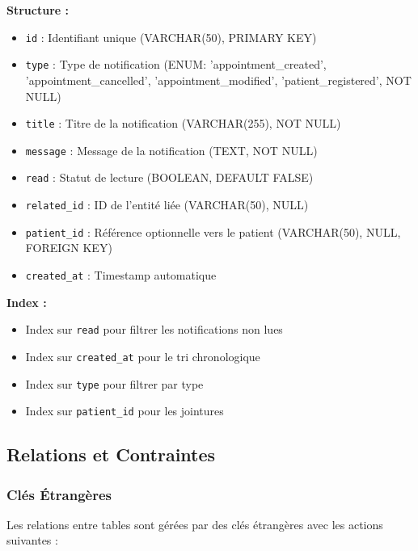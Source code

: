 \documentclass[12pt,a4paper]{report}
\begin{document}
\textbf{Structure :}
\begin{itemize}
    \item \texttt{id} : Identifiant unique (VARCHAR(50), PRIMARY KEY)
    \item \texttt{type} : Type de notification (ENUM: 'appointment\_created', 'appointment\_cancelled', 'appointment\_modified', 'patient\_registered', NOT NULL)
    \item \texttt{title} : Titre de la notification (VARCHAR(255), NOT NULL)
    \item \texttt{message} : Message de la notification (TEXT, NOT NULL)
    \item \texttt{read} : Statut de lecture (BOOLEAN, DEFAULT FALSE)
    \item \texttt{related\_id} : ID de l'entité liée (VARCHAR(50), NULL)
    \item \texttt{patient\_id} : Référence optionnelle vers le patient (VARCHAR(50), NULL, FOREIGN KEY)
    \item \texttt{created\_at} : Timestamp automatique
\end{itemize}

\textbf{Index :}
\begin{itemize}
    \item Index sur \texttt{read} pour filtrer les notifications non lues
    \item Index sur \texttt{created\_at} pour le tri chronologique
    \item Index sur \texttt{type} pour filtrer par type
    \item Index sur \texttt{patient\_id} pour les jointures
\end{itemize}

\subsection{Relations et Contraintes}

\subsubsection{Clés Étrangères}

Les relations entre tables sont gérées par des clés étrangères avec les actions suivantes :
\end{document}
